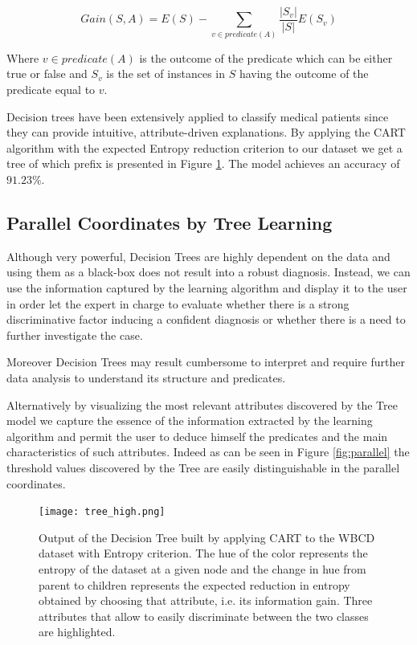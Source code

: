 \documentclass{article}
\begin{document}
\[ Gain(S, A) = E(S) - \sum_{v \in predicate(A)} \frac{|S_v|}{|S|} E(S_v) \]

Where $v \in predicate(A)$ is the outcome of the predicate which can be either
true or false and $S_v$ is the set of instances in $S$ having the outcome of the
predicate equal to $v$.

Decision trees have been extensively applied to classify medical patients
since they can provide intuitive, attribute-driven explanations. By applying the
CART algorithm with the expected Entropy reduction criterion to our dataset we
get a tree of which prefix is presented in Figure \ref{fig:tree}. The model
achieves an accuracy of $91.23\%$.

\subsection{Parallel Coordinates by Tree Learning}
\label{sec:treelearn}


Although very powerful, Decision Trees are highly dependent on the data and
using them as a black-box does not result into a robust diagnosis. Instead, we
can use the information captured by the learning algorithm and display it to the
user in order let the expert in charge to evaluate whether there is a strong
discriminative factor inducing a confident diagnosis or whether there is a need
to further investigate the case.

Moreover Decision Trees may result cumbersome to interpret and require further
data analysis to understand its structure and predicates.

Alternatively by visualizing the most relevant attributes discovered by the Tree
model we capture the essence of the information extracted by the learning
algorithm and permit the user to deduce himself the predicates and the main
characteristics of such attributes. Indeed as can be seen in Figure
\ref{fig:parallel} the threshold values discovered by the Tree are easily
distinguishable in the parallel coordinates.



\begin{figure}
\centering
\texttt{[image: tree\_high.png]} \\
\caption{Output of the Decision Tree built by applying CART to the WBCD
dataset with Entropy criterion. The hue of the color represents the entropy of
the dataset at a given node and the change in hue from parent to children
represents the expected reduction in entropy obtained by choosing that
attribute, i.e. its information gain.
Three attributes that allow to easily discriminate between
the two classes are highlighted.}
\label{fig:tree}
\end{figure}
\end{document}
